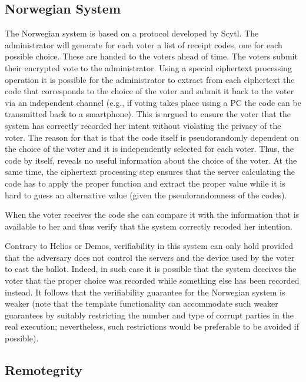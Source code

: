 \subsection{Norwegian System}

The Norwegian system \cite{norwegian} is based on a protocol developed
by Scytl. The administrator will generate for each voter a list of
receipt codes, one for each possible choice. These are handed to the
voters ahead of time. The voters submit their encrypted vote to the
administrator. Using a special ciphertext processing operation it is
possible for the administrator to extract from each ciphertext the
code that corresponds to the choice of the voter and submit it back to
the voter via an independent channel (e.g., if voting takes place
using a PC the code can be transmitted back to a smartphone). This is
argued to ensure the voter that the system has correctly recorded her
intent without violating the privacy of the voter. The reason for that
is that the code itself is pseudorandomly dependent on the choice of
the voter and it is independently selected for each voter. Thus, the
code by itself, reveals no useful information about the choice of the
voter. At the same time, the ciphertext processing step ensures that
the server calculating the code has to apply the proper function and
extract the proper value while it is hard to guess an alternative
value (given the pseudorandomness of the codes).

When the voter receives the code she can compare it with the
information that is available to her and thus verify that the system
correctly recoded her intention.

Contrary to Helios or Demos, verifiability in this system can only
hold provided that the adversary does not control the servers and the
device used by the voter to cast the ballot. Indeed, in such case it
is possible that the system deceives the voter that the proper choice
was recorded while something else has been recorded instead. It
follows that the verifiability guarantee for the Norwegian system is
weaker (note that the template functionality can accommodate such
weaker guarantees by suitably restricting the number and type of
corrupt parties in the real execution; nevertheless, such restrictions
would be preferable to be avoided if possible).

\subsection{Remotegrity}

